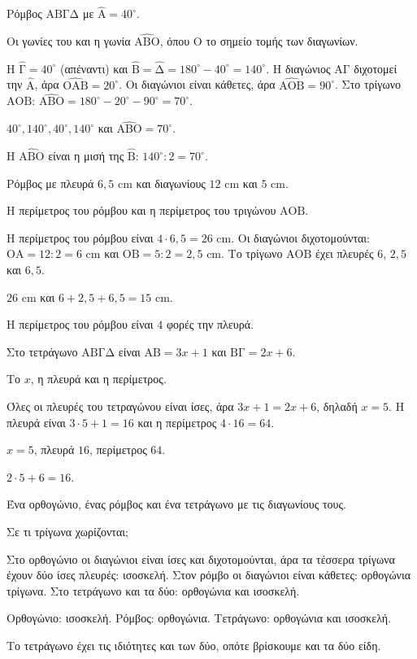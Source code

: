 \tixero Ρόμβος $\mathrm{ΑΒΓΔ}$ με $\hat{\mathrm{Α}}=40^\circ$.\par
\tithelo Οι γωνίες του και η γωνία $\widehat{\mathrm{ΑΒΟ}}$, όπου $\mathrm{Ο}$ το σημείο τομής των διαγωνίων.\par
\possindeo Η $\hat{\mathrm{Γ}}=40^\circ$ (απέναντι) και $\hat{\mathrm{Β}}=\hat{\mathrm{Δ}}=180^\circ-40^\circ=140^\circ$. Η διαγώνιος $\mathrm{ΑΓ}$ διχοτομεί την $\hat{\mathrm{Α}}$, άρα $\widehat{\mathrm{ΟΑΒ}}=20^\circ$. Οι διαγώνιοι είναι κάθετες, άρα $\widehat{\mathrm{ΑΟΒ}}=90^\circ$. Στο τρίγωνο $\mathrm{ΑΟΒ}$: $\widehat{\mathrm{ΑΒΟ}}=180^\circ-20^\circ-90^\circ=70^\circ$.\par
\apantisi $40^\circ,140^\circ,40^\circ,140^\circ$ και $\widehat{\mathrm{ΑΒΟ}}=70^\circ$.\par
\elegxos Η $\widehat{\mathrm{ΑΒΟ}}$ είναι η μισή της $\hat{\mathrm{Β}}$: $140^\circ:2=70^\circ$.

\tixero Ρόμβος με πλευρά $6{,}5$ cm και διαγωνίους $12$ cm και $5$ cm.\par
\tithelo Η περίμετρος του ρόμβου και η περίμετρος του τριγώνου $\mathrm{ΑΟΒ}$.\par
\possindeo Η περίμετρος του ρόμβου είναι $4\cdot6{,}5=26$ cm. Οι διαγώνιοι διχοτομούνται: $\mathrm{ΟΑ}=12:2=6$ cm και $\mathrm{ΟΒ}=5:2=2{,}5$ cm. Το τρίγωνο $\mathrm{ΑΟΒ}$ έχει πλευρές $6$, $2{,}5$ και $6{,}5$.\par
\apantisi $26$ cm και $6+2{,}5+6{,}5=15$ cm.\par
\elegxos Η περίμετρος του ρόμβου είναι $4$ φορές την πλευρά.

\tixero Στο τετράγωνο $\mathrm{ΑΒΓΔ}$ είναι $\mathrm{ΑΒ}=3x+1$ και $\mathrm{ΒΓ}=2x+6$.\par
\tithelo Το $x$, η πλευρά και η περίμετρος.\par
\possindeo Όλες οι πλευρές του τετραγώνου είναι ίσες, άρα $3x+1=2x+6$, δηλαδή $x=5$. Η πλευρά είναι $3\cdot5+1=16$ και η περίμετρος $4\cdot16=64$.\par
\apantisi $x=5$, πλευρά $16$, περίμετρος $64$.\par
\elegxos $2\cdot5+6=16$.

\tixero Ένα ορθογώνιο, ένας ρόμβος και ένα τετράγωνο με τις διαγωνίους τους.\par
\tithelo Σε τι τρίγωνα χωρίζονται;\par
\possindeo Στο ορθογώνιο οι διαγώνιοι είναι ίσες και διχοτομούνται, άρα τα τέσσερα τρίγωνα έχουν δύο ίσες πλευρές: ισοσκελή. Στον ρόμβο οι διαγώνιοι είναι κάθετες: ορθογώνια τρίγωνα. Στο τετράγωνο και τα δύο: ορθογώνια και ισοσκελή.\par
\apantisi Ορθογώνιο: ισοσκελή. Ρόμβος: ορθογώνια. Τετράγωνο: ορθογώνια και ισοσκελή.\par
\elegxos Το τετράγωνο έχει τις ιδιότητες και των δύο, οπότε βρίσκουμε και τα δύο είδη.

